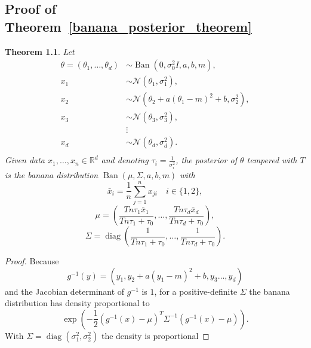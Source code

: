 \documentclass[english,twoside,openright]{HYgraduMLDS}
\newtheorem{theorem}[lemma]{Theorem}
\newcommand{\R}{\mathbb{R}}
\newcommand{\caln}{{\mathcal{N}}}
\DeclareMathOperator{\ban}{Ban}
\DeclareMathOperator{\diag}{diag}
\begin{document}
\begin{appendices}
\myappendixtitle

\chapter{Proof of Theorem~\ref{banana_posterior_theorem}}\label{banana_posterior_theorem_proof}

\setcounter{temp_counter}{\value{lemma}}
\setcounter{temp_counter_chap}{\value{chapter}}
\renewcommand{\thelemma}{5.2}
\begin{theorem}
    Let
    \begin{align*}
        \theta = (\theta_1,\dotsc, \theta_d) &\sim
        \ban(0, \sigma_0^2I, a, b, m), \\
        x_1 &\sim \caln(\theta_1, \sigma_1^2), \\
        x_2 &\sim \caln(\theta_2 + a(\theta_1 - m)^2 + b, \sigma_2^2),\\
        x_3 &\sim \caln(\theta_3, \sigma_3^2), \\
            &\vdots \\
        x_d &\sim \caln(\theta_d, \sigma_d^2). \\
    \end{align*}
    Given data \(x_1,\dotsc, x_n\in \R^d\) and
    denoting \(\tau_i = \frac{1}{\sigma_i^2}\),
    the posterior of \(\theta\) tempered with \(T\) is the banana distribution
    \(\ban(\mu, \Sigma, a, b, m)\)
    with
    \[
        \bar{x}_i = \frac{1}{n}\sum_{j=1}^n x_{ji} \quad i\in \{1, 2\},
    \]
    \[
        \mu = \left(\frac{Tn\tau_1\bar{x}_1}{Tn\tau_1 + \tau_0},\dotsc,
        \frac{Tn\tau_d\bar{x}_d}{Tn\tau_d + \tau_0}\right),
    \]
    \[
        \Sigma = \diag\left(
            \frac{1}{Tn\tau_1 + \tau_0},\dotsc,
            \frac{1}{Tn\tau_d + \tau_0}
        \right).
    \]
\end{theorem}
\begin{proof}
    Because
    \[
    g^{-1}(y) = (y_1, y_2 + a(y_1 - m)^2 + b, y_3\dotsc, y_d)
    \]
    and the Jacobian determinant of \(g^{-1}\) is \(1\),
    for a positive-definite \(\Sigma\) the banana distribution has
    density proportional to
    \[
    \exp\left(-\frac{1}{2}(g^{-1}(x) - \mu)^T\Sigma^{-1}(g^{-1}(x) - \mu)\right).
    \]
    With \(\Sigma = \diag(\sigma_1^2, \sigma_2^2)\) the density is proportional

\end{proof}
\end{appendices}
\end{document}
